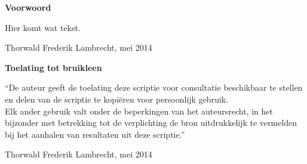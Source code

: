 
\newpage

\noindent \textbf{\huge Voorwoord}

\vspace{1.5cm}

\noindent
Hier komt wat tekst.

\addvspace{4cm}

\noindent Thorwald Frederik Lambrecht, mei 2014\newpage

\noindent \textbf{\huge Toelating tot bruikleen}

\vspace{1.5cm}

\noindent
``De auteur geeft de toelating deze scriptie voor consultatie beschikbaar
te stellen en delen van de scriptie te kopi\"eren voor persoonlijk
gebruik.\\
Elk ander gebruik valt onder de beperkingen van het auteursrecht,
in het bijzonder met betrekking tot de verplichting de bron uitdrukkelijk
te vermelden bij het aanhalen van resultaten uit deze scriptie.''

\addvspace{4cm}

\noindent Thorwald Frederik Lambrecht, mei 2014
